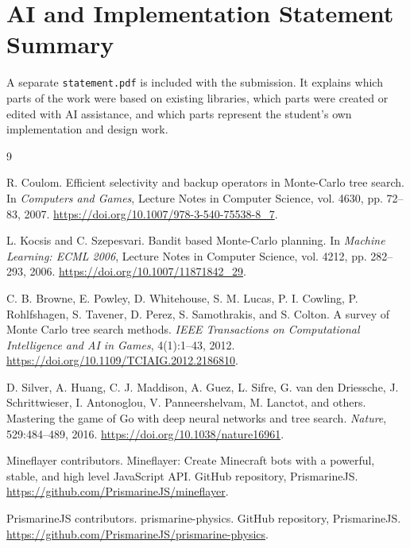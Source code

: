 \documentclass[11pt]{article}
\begin{document}
\section*{AI and Implementation Statement Summary}

A separate \texttt{statement.pdf} is included with the submission. It explains which parts of the work were based on existing libraries, which parts were created or edited with AI assistance, and which parts represent the student's own implementation and design work.

\begin{thebibliography}{9}

R. Coulom.
\newblock Efficient selectivity and backup operators in Monte-Carlo tree search.
\newblock In \emph{Computers and Games}, Lecture Notes in Computer Science, vol. 4630, pp. 72--83, 2007.
\newblock \url{https://doi.org/10.1007/978-3-540-75538-8_7}.

L. Kocsis and C. Szepesvari.
\newblock Bandit based Monte-Carlo planning.
\newblock In \emph{Machine Learning: ECML 2006}, Lecture Notes in Computer Science, vol. 4212, pp. 282--293, 2006.
\newblock \url{https://doi.org/10.1007/11871842_29}.

C. B. Browne, E. Powley, D. Whitehouse, S. M. Lucas, P. I. Cowling, P. Rohlfshagen, S. Tavener, D. Perez, S. Samothrakis, and S. Colton.
\newblock A survey of Monte Carlo tree search methods.
\newblock \emph{IEEE Transactions on Computational Intelligence and AI in Games}, 4(1):1--43, 2012.
\newblock \url{https://doi.org/10.1109/TCIAIG.2012.2186810}.

D. Silver, A. Huang, C. J. Maddison, A. Guez, L. Sifre, G. van den Driessche, J. Schrittwieser, I. Antonoglou, V. Panneershelvam, M. Lanctot, and others.
\newblock Mastering the game of Go with deep neural networks and tree search.
\newblock \emph{Nature}, 529:484--489, 2016.
\newblock \url{https://doi.org/10.1038/nature16961}.

Mineflayer contributors.
\newblock Mineflayer: Create Minecraft bots with a powerful, stable, and high level JavaScript API.
\newblock GitHub repository, PrismarineJS.
\newblock \url{https://github.com/PrismarineJS/mineflayer}.

PrismarineJS contributors.
\newblock prismarine-physics.
\newblock GitHub repository, PrismarineJS.
\newblock \url{https://github.com/PrismarineJS/prismarine-physics}.

\end{thebibliography}
\end{document}
